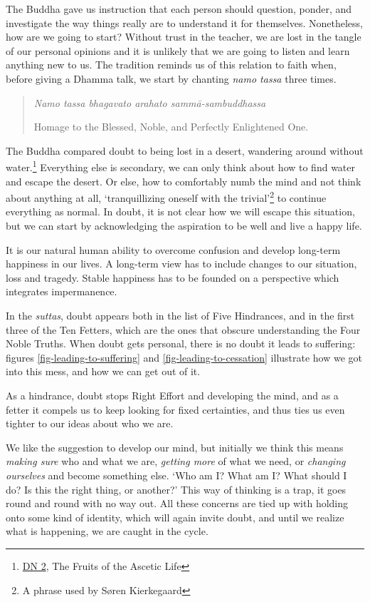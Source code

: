 The Buddha gave us instruction that each person should question, ponder,
and investigate the way things really are to understand it for
themselves. Nonetheless, how are we going to start? Without trust in the
teacher, we are lost in the tangle of our personal opinions and it is
unlikely that we are going to listen and learn anything new to us. The
tradition reminds us of this relation to faith when, before giving a
Dhamma talk, we start by chanting \emph{namo tassa} three times.

\begin{quote}
\emph{Namo tassa bhagavato arahato sammā-sambuddhassa}

Homage to the Blessed, Noble, and Perfectly Enlightened One.
\end{quote}


The Buddha compared doubt to being lost in a desert, wandering around
without water.\footnote{\href{https://suttacentral.net/dn2}{DN 2}, The
  Fruits of the Ascetic Life} Everything else is secondary, we can only
think about how to find water and escape the desert. Or else, how to
comfortably numb the mind and not think about anything at all,
`tranquillizing oneself with the trivial'\footnote{A phrase used by
  Søren Kierkegaard} to continue everything as normal. In doubt, it is
not clear how we will escape this situation, but we can start by
acknowledging the aspiration to be well and live a happy life.

It is our natural human ability to overcome confusion and develop
long-term happiness in our lives. A long-term view has to include
changes to our situation, loss and tragedy. Stable happiness has to be
founded on a perspective which integrates impermanence.

In the \emph{suttas}, doubt appears both in the list of Five Hindrances,
and in the first three of the Ten Fetters, which are the ones that
obscure understanding the Four Noble Truths. When doubt gets personal,
there is no doubt it leads to suffering: figures
\ref{fig-leading-to-suffering} and \ref{fig-leading-to-cessation}
illustrate how we got into this mess, and how we can get out of it.

As a hindrance, doubt stops Right Effort and developing the mind, and as
a fetter it compels us to keep looking for fixed certainties, and thus
ties us even tighter to our ideas about who we are.

We like the suggestion to develop our mind, but initially we think this
means \emph{making sure} who and what we are, \emph{getting more} of
what we need, or \emph{changing ourselves} and become something else.
`Who am I? What am I? What should I do? Is this the right thing, or
another?' This way of thinking is a trap, it goes round and round with
no way out. All these concerns are tied up with holding onto some kind
of identity, which will again invite doubt, and until we realize what is
happening, we are caught in the cycle.

